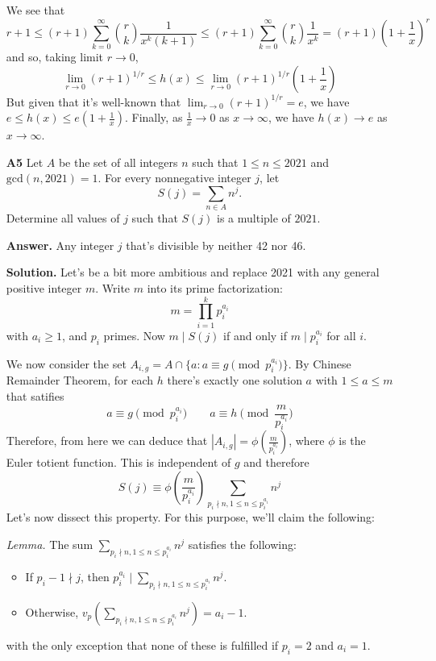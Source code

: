 \documentclass[11pt,a4paper]{article}
\newcommand{\<}{\langle}
\renewcommand{\>}{\rangle}
\begin{document}
\begin{enumerate}
	We see that
	\[
	r+1
	\le 
	(r+1)\sum_{k=0}^{\infty}\binom{r}{k}\frac{1}{x^k(k+1)}
	\le (r+1)\sum_{k=0}^{\infty}\binom{r}{k}\frac{1}{x^k}
	=(r+1)\left(1+\frac{1}{x}\right)^r
	\]
	and so, taking limit $r\to 0$, 
	\[\lim_{r\to 0}(r+1)^{1/r}\le h(x)\le \lim_{r\to 0}(r+1)^{1/r}\left(1+\frac 1x\right)
	\] 
	But given that it's well-known that $\lim_{r\to 0}(r+1)^{1/r}=e$, we have $e\le h(x)\le e(1+\frac 1x)$. Finally, as $\frac 1x\to 0$ as $x\to\infty$, we have $h(x)\to e$ as $x\to\infty$.
	
	\item [\textbf{A5}] Let $A$ be the set of all integers $n$ such that $1 \le n \le 2021$ and $\text{gcd}(n,2021)=1$. For every nonnegative integer $j$, let
	\[
	S(j)=\sum_{n \in A}n^j.
	\]Determine all values of $j$ such that $S(j)$ is a multiple of $2021$.
	
	\textbf{Answer.} Any integer $j$ that's divisible by neither 42 nor 46. 
	
	\textbf{Solution.} 
	Let's be a bit more ambitious and replace 2021 with any general positive integer $m$. 
	Write $m$ into its prime factorization: 
	\[
	m = \prod_{i=1}^k p_i^{a_i}
	\]
	with $a_i\ge 1$, and $p_i$ primes. 
	Now $m\mid S(j)$ if and only if $m\mid p_i^{a_i}$ for all $i$. 
	
	We now consider the set $A_{i, g}=A\cap \{a: a\equiv g\pmod{p_i^{a_i}}\}$. 
	By Chinese Remainder Theorem, for each $h$ there's exactly one solution $a$ with $1\le a\le m$ that satifies 
	\[
	a\equiv g\pmod{p_i^{a_i}}\qquad a\equiv h\pmod{\frac{m}{p_i^{a_i}}}
	\]
	Therefore, from here we can deduce that $|A_{i, g}|=\phi\left(\frac{m}{p_i^{a_i}}\right)$, 
	where $\phi$ is the Euler totient function. This is independent of $g$ and therefore 
	\[
	S(j)\equiv \phi\left(\frac{m}{p_i^{a_i}}\right)\sum_{p_i\nmid n, 1\le n\le p_i^{a_i}}n^j
	\]
	Let's now dissect this property. 
	For this purpose, we'll claim the following: 
	
	\emph{Lemma.} The sum $\sum_{p_i\nmid n, 1\le n\le p_i^{a_i}}n^j$ satisfies the following: 
	\begin{itemize}
		\item If $p_i-1\nmid j$, then $p_i^{a_i}\mid \sum_{p_i\nmid n, 1\le n\le p_i^{a_i}}n^j$. 
		
		\item Otherwise, $v_p(\sum_{p_i\nmid n, 1\le n\le p_i^{a_i}}n^j)=a_i-1$. 
	\end{itemize}
    with the only exception that none of these is fulfilled if $p_i=2$ and $a_i=1$. 
    

\end{enumerate}
\end{document}

